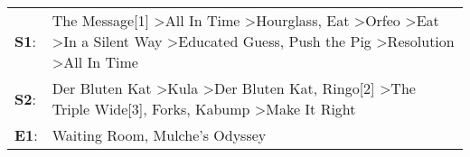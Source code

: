 \begin{supertabular}{p{0.03\textwidth}p{0.92\textwidth}}
 \textbf{S1}:  &  The Message[1]\textsuperscript{} \textgreater \enspace All In Time\textsuperscript{} \textgreater \enspace Hourglass\textsuperscript{}, \enspace Eat\textsuperscript{} \textgreater \enspace Orfeo\textsuperscript{} \textgreater \enspace Eat\textsuperscript{} \textgreater \enspace In a Silent Way\textsuperscript{} \textgreater \enspace Educated Guess\textsuperscript{}, \enspace Push the Pig\textsuperscript{} \textgreater \enspace Resolution\textsuperscript{} \textgreater \enspace All In Time\textsuperscript{}  \enspace  \\
 \textbf{S2}:  &                                                                                                                                                                  Der Bluten Kat\textsuperscript{} \textgreater \enspace Kula\textsuperscript{} \textgreater \enspace Der Bluten Kat\textsuperscript{}, \enspace Ringo[2]\textsuperscript{} \textgreater \enspace The Triple Wide[3]\textsuperscript{}, \enspace Forks\textsuperscript{}, \enspace Kabump\textsuperscript{} \textgreater \enspace Make It Right\textsuperscript{}  \enspace  \\
 \textbf{E1}:  &                                                                                                                                                                                                                                                                                                                                                                                                                                                      Waiting Room\textsuperscript{}, \enspace Mulche's Odyssey\textsuperscript{}  \enspace  \\
\end{supertabular}
